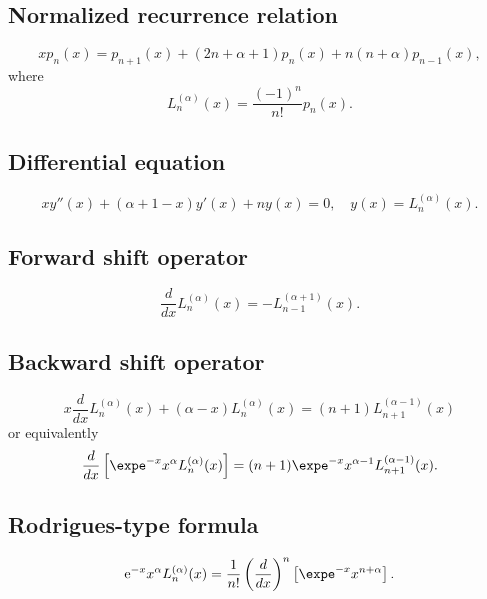 \documentclass[envcountchap,graybox]{svmono}
\newcommand{\e}{\textrm{e}}
\begin{document}
\subsection*{Normalized recurrence relation}
\begin{equation}
\label{NormRecLaguerre}
xp_n(x)=p_{n+1}(x)+(2n+\alpha+1)p_n(x)+n(n+\alpha)p_{n-1}(x),
\end{equation}
where
$$L_n^{(\alpha)}(x)=\frac{(-1)^n}{n!}p_n(x).$$

\subsection*{Differential equation}
\begin{equation}
\label{dvLaguerre}
xy''(x)+(\alpha+1-x)y'(x)+ny(x)=0,\quad y(x)=L_n^{(\alpha)}(x).
\end{equation}

\newpage

\subsection*{Forward shift operator}
\begin{equation}
\label{shift1Laguerre}
\frac{d}{dx}L_n^{(\alpha)}(x)=-L_{n-1}^{(\alpha+1)}(x).
\end{equation}

\subsection*{Backward shift operator}
\begin{equation}
\label{shift2LaguerreI}
x\frac{d}{dx}L_n^{(\alpha)}(x)+(\alpha-x)L_n^{(\alpha)}(x)=(n+1)L_{n+1}^{(\alpha-1)}(x)
\end{equation}
or equivalently
\begin{equation}
\label{shift2LaguerreII}
\frac{d}{dx}\left[\expe^{-x}x^{\alpha}L_n^{(\alpha)}(x)\right]=(n+1)\expe^{-x}x^{\alpha-1}L^{(\alpha-1)}_{n+1}(x).
\end{equation}

\subsection*{Rodrigues-type formula}
\begin{equation}
\label{RodLaguerre}
\e^{-x}x^{\alpha}L_n^{(\alpha)}(x)=\frac{1}{n!}\left(\frac{d}{dx}\right)^n\left[\expe^{-x}x^{n+\alpha}\right].
\end{equation}
\end{document}

